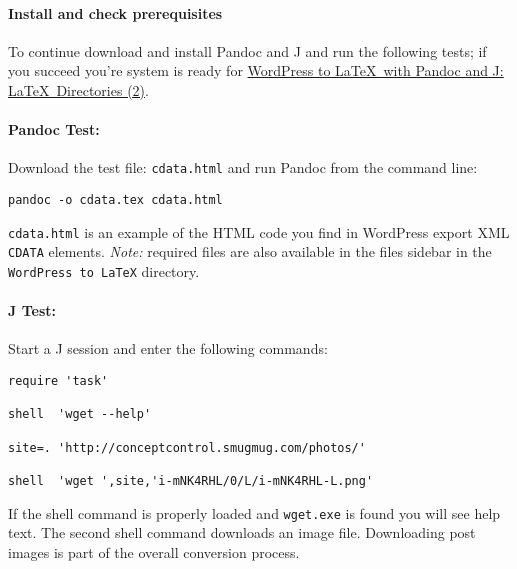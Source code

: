 \paragraph{Install and check prerequisites}

To continue download and install Pandoc and J and run the following
tests; if you succeed you're system is ready for
\href{http://bakerjd99.wordpress.com/2012/02/18/wordpress-to-latex-with-pandoc-and-j-latex-directories-part-2-2/}{WordPress
to \LaTeX\ with Pandoc and J: \LaTeX\ Directories (2)}.

\paragraph{Pandoc Test:} Download the test file: \texttt{cdata.html} and run Pandoc from the
command line:

\begin{verbatim}
pandoc -o cdata.tex cdata.html
\end{verbatim}

\noindent \texttt{cdata.html} is an example of the HTML code you find in WordPress
export XML \texttt{CDATA} elements. \emph{Note:} required files are also
available in the files sidebar in the \texttt{WordPress to LaTeX}
directory.

\paragraph{J Test:} Start a J session and enter the following commands:
\begin{verbatim}
require 'task'

shell  'wget --help'

site=. 'http://conceptcontrol.smugmug.com/photos/'

shell  'wget ',site,'i-mNK4RHL/0/L/i-mNK4RHL-L.png'
\end{verbatim}

\noindent If the shell command is properly loaded and \texttt{wget.exe} is found
you will see help text. The second shell command downloads an image
file. Downloading post images is part of the overall conversion process.




%